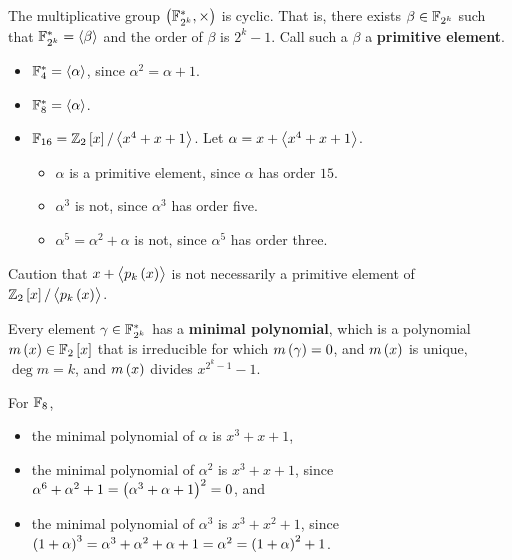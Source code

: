 \begin{fact*}
The multiplicative group $ \br{\FF_{2^k}^*, \times} $ is cyclic. That is, there exists $ \beta \in \mathbb{F}_{2^k} $ such that $ \mathbb{F}_{2^k}^* = \left\langle \beta \right\rangle $ and the order of $ \beta $ is $ 2^k - 1 $. Call such a $ \beta $ a \textbf{primitive element}.
\end{fact*}

\begin{example*}
\hfill
\begin{itemize}
\item $ \mathbb{F}_4^* = \left\langle \alpha \right\rangle $, since $ \alpha^2 = \alpha + 1 $.
\item $ \mathbb{F}_8^* = \left\langle \alpha \right\rangle $.
\item $ \FF_{16} = \ZZ_2\sbr{x} / \abr{x^4 + x + 1} $. Let $ \alpha = x + \left\langle x^4 + x + 1 \right\rangle $.
\begin{itemize}
\item $ \alpha $ is a primitive element, since $ \alpha $ has order $ 15 $.
\item $ \alpha^3 $ is not, since $ \alpha^3 $ has order five.
\item $ \alpha^5 = \alpha^2 + \alpha $ is not, since $ \alpha^5 $ has order three.
\end{itemize}
\end{itemize}
\end{example*}

Caution that $ x + \abr{p_k\br{x}} $ is not necessarily a primitive element of $ \ZZ_2\sbr{x} / \abr{p_k\br{x}} $.

\begin{fact*}
Every element $ \gamma \in \mathbb{F}_{2^k}^* $ has a \textbf{minimal polynomial}, which is a polynomial $ m\br{x} \in \FF_2\sbr{x} $ that is irreducible for which $ m\br{\gamma} = 0 $, and $ m\br{x} $ is unique, $ \deg m = k $, and $ m\br{x} $ divides $ x^{2^k - 1} - 1 $.
\end{fact*}

\begin{example*}
For $ \mathbb{F}_8 $,
\begin{itemize}
\item the minimal polynomial of $ \alpha $ is $ x^3 + x + 1 $,
\item the minimal polynomial of $ \alpha^2 $ is $ x^3 + x + 1 $, since $ \alpha^6 + \alpha^2 + 1 = \br{\alpha^3 + \alpha + 1}^2 = 0 $, and
\item the minimal polynomial of $ \alpha^3 $ is $ x^3 + x^2 + 1 $, since $ \br{1 + \alpha}^3 = \alpha^3 + \alpha^2 + \alpha + 1 = \alpha^2 = \br{1 + \alpha}^2 + 1 $.
\end{itemize}
\end{example*}

